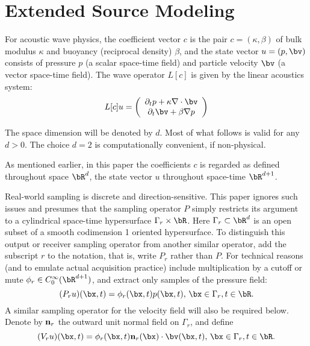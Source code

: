 

\section{Extended Source Modeling}
For acoustic wave physics, the coefficient vector $c$ is the pair $c=(\kappa,\beta)$ of bulk modulus $\kappa$ and buoyancy (reciprocal density) $\beta$, and the state vector $u=(p,\bv)$ consists of pressure $p$ (a scalar space-time field) and particle velocity $\bv$ (a vector space-time field). The wave operator $L[c]$ is given by the linear acoustics system:
\begin{equation}
\label{eqn:awe}
L[c]u = 
\left(
\begin{array}{c}
\partial_t p  + \kappa \nabla \cdot \bv \\
\partial_t \bv + \beta \nabla p
\end{array}
\right) 
\end{equation}

The space dimension will be denoted by $d$. Most of what follows is valid for any $d >0$. The choice $d=2$ is computationally convenient, if non-physical. 

As mentioned earlier, in this paper the coefficients $c$ is regarded as defined throughout space $\bR^d$, the state vector $u$ throughout space-time $\bR^{d+1}$. 

Real-world sampling is discrete and direction-sensitive. This paper ignores such issues and presumes that the sampling operator $P$ simply restricts its argument to a cylindrical space-time hypersurface $\Gamma_r \times \bR$.  Here $\Gamma_r \subset \bR^d$ is an open subset of a smooth codimension 1 oriented hypersurface. To distinguish this output or receiver sampling operator from another similar operator, add the subscript $r$ to the notation, that is, write $P_r$ rather than $P$. For technical reasons (and to emulate actual acquisition practice) include multiplication by a cutoff or mute $\phi_r \in C_0^{\infty}(\bR^{d+1})$, and extract only samples of the pressure field:
\begin{equation}
\label{eqn:recp}
(P_ru)(\bx,t) = \phi_r(\bx,t)p(\bx,t),\,\bx \in \Gamma_r, t \in \bR. 
\end{equation}
A similar sampling operator for the velocity field will also be required below. Denote by ${\bf n}_r$ the outward unit normal field on $\Gamma_r$, and define
\begin{equation}
\label{eqn:recv}
(V_ru)(\bx,t) = \phi_r(\bx,t){\bf n}_r(\bx)\cdot \bv(\bx,t),\,\bx \in \Gamma_r, t \in \bR.
\end{equation}

